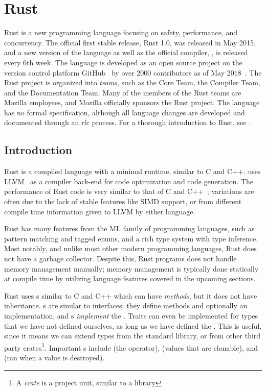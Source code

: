 \chapter{Rust\label{ch:rust}}
\begin{epigraphs}
\end{epigraphs}

Rust \cite{rust} is a new programming language focusing on safety, performance, and concurrency.
The official first stable release, Rust 1.0, was released in May 2015, and a new version of the
language as well as the official compiler, , is released every 6th week. The language
is developed as an open source project on the version control platform GitHub~\cite{github} by over
2000 contributors as of May 2018~\cite{rust-github}. The Rust project is organized into
\emph{teams}, such as the Core Team, the Compiler Team, and the Documentation Team. Many of the
members of the Rust teams are Mozilla employees, and Mozilla officially sponsors the Rust project.
The language has no formal specification, although all language changes are developed and
documented through an \gls{rfc} process. For a thorough introduction to Rust, see \cite{trpl}.


\clearpage

\section{Introduction}

Rust is a compiled language with a minimal runtime, similar to C and C++.  uses
LLVM~\cite{llvm} as a compiler back-end for code optimization and code generation. The performance of
Rust code is very similar to that of C and C++~\cite{rust-perf}; variations are often due to the
lack of stable features like SIMD support, or from different compile time information given to LLVM
by either language.

Rust has many features from the ML family of programming languages, such as pattern matching and
tagged enums, and a rich type system with type inference. Most notably, and unlike most other
modern programming languages, Rust does not have a garbage collector. Despite this, Rust programs
does not handle memory management manually; memory management is typically done statically at
compile time by utilizing language features covered in the upcoming sections.

Rust uses s similar to C and C++ which can have \emph{methods}, but it does not have
inheritance. s are similar to interfaces: they define methods and optionally an
implementation, and s \emph{implement} the . Traits can even be
implemented for types that we have not defined ourselves, as long as we have defined the
. This is useful, since it means we can extend types from the standard library, or from
other third party crates\footnote{A \emph{crate} is a project unit, similar to a library}.
Important s include  (the \code{*} operator),  (values that are
clonable), and  (ran when a value is destroyed).

